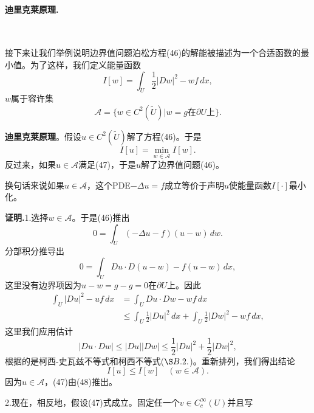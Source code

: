 \documentclass[leqno]{article}
\numberwithin{equation}{subsection}%
\begin{document}
\paragraph{迪里克莱原理.}~{}
\par
接下来让我们举例说明边界值问题泊松方程(46)的解能被描述为一个合适函数的最小值。为了这样，我们定义能量函数
\begin{equation*}
I[w]=\int_{U}\frac{1}{2}|Dw|^{2}-wf\,dx,
\end{equation*}
$w$属于容许集
\begin{equation*}
\mathcal{A}=\{w\in C^{2}(\tilde{U})|w=g\text{在}\partial U\text{上}\}.
\end{equation*}
\par
\noindent\textbf{迪里克莱原理}。假设$u\in C^{2}(\tilde{U})$解了方程(46)。于是
\begin{equation}
I[u]=\min_{w\in \mathcal{A}}I[w].
\end{equation}
反过来，如果$u\in\mathcal{A}$满足(47)，于是$u$解了边界值问题(46)。
\par
换句话来说如果$u\in\mathcal{A}$，这个PDE$-\Delta u=f$成立等价于声明$u$使能量函数$I[\cdot]$最小化。
\par
\noindent\textbf{证明.}1.选择$w\in\mathcal{A}$。于是(46)推出
\begin{equation*}
0=\int_{U}(-\Delta u-f)(u-w)\,dw.
\end{equation*}
分部积分推导出
\begin{equation*}
0=\int_{U}Du\cdot D(u-w)-f(u-w)\,dx,
\end{equation*}
这里没有边界项因为$u-w=g-g=0$在$\partial U$上。因此
\begin{equation*}
\begin{aligned}
\int_{U}|Du|^{2}-uf\,dx&=\int_{U}Du\cdot Dw-wf\,dx\\
&\leq\int_{U}\frac{1}{2}|Du|^{2}\,dx+\int_{U}\frac{1}{2}|Dw|^{2}-wf\,dx,
\end{aligned}
\end{equation*}
这里我们应用估计
\begin{equation*}
|Du\cdot Dw|\leq|Du||Dw|\leq\frac{1}{2}|Du|^{2}+\frac{1}{2}|Dw|^{2},
\end{equation*}
根据的是柯西-史瓦兹不等式和柯西不等式($\S B.2.$)。重新排列，我们得出结论
\begin{equation}
I[u]\leq I[w]\quad(w\in\mathcal{A}).
\end{equation}
因为$u\in\mathcal{A}$，(47)由(48)推出。
\par
2.现在，相反地，假设(47)式成立。固定任一个$v\in C_{c}^{\infty}(U)$并且写
\end{document}
